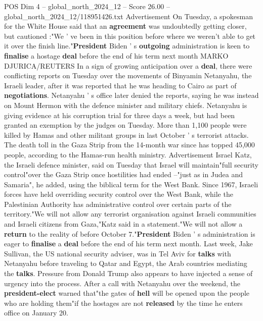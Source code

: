 \begin{textsample}{POS Dim 4 – global\_north\_2024\_12 – Score 26.00 – global\_north\_2024\_12/118951426.txt}
Advertisement On Tuesday, a spokesman for the White House said that an \textbf{agreement} was undoubtedly getting closer, but cautioned :"We ' ve been in this position before where we weren't able to get it over the finish line."\textbf{President} Biden ' s \textbf{outgoing} administration is keen to \textbf{finalise} a hostage \textbf{deal} before the end of his term next month MARKO DJURICA/REUTERS In a sign of growing anticipation over a \textbf{deal}, there were conflicting reports on Tuesday over the movements of Binyamin Netanyahu, the Israeli leader, after it was reported that he was heading to Cairo as part of \textbf{negotiations}.
Netanyahu ' s office later denied the reports, saying he was instead on Mount Hermon with the defence minister and military chiefs.
Netanyahu is giving evidence at his corruption trial for three days a week, but had been granted an exemption by the judges on Tuesday.
More than 1,100 people were killed by Hamas and other militant groups in last October ' s terrorist attacks.
The death toll in the Gaza Strip from the 14-month war since has topped 45,000 people, according to the Hamas-run health ministry.
Advertisement Israel Katz, the Israeli defence minister, said on Tuesday that Israel will maintain"full security control"over the Gaza Strip once hostilities had ended --"just as in Judea and Samaria", he added, using the biblical term for the West Bank.
Since 1967, Israeli forces have held overriding security control over the West Bank, while the Palestinian Authority has administrative control over certain parts of the territory."We will not allow any terrorist organisation against Israeli communities and Israeli citizens from Gaza,"Katz said in a statement."We will not allow a \textbf{return} to the reality of before October 7."\textbf{President} Biden ' s administration is eager to \textbf{finalise} a \textbf{deal} before the end of his term next month.
Last week, Jake Sullivan, the US national security adviser, was in Tel Aviv for \textbf{talks} with Netanyahu before traveling to Qatar and Egypt, the Arab countries mediating the \textbf{talks}.
Pressure from Donald Trump also appears to have injected a sense of urgency into the process.
After a call with Netanyahu over the weekend, the \textbf{president-elect} warned that"the gates of \textbf{hell} will be opened upon the people who are holding them"if the hostages are not \textbf{released} by the time he enters office on January 20.

\end{textsample}
